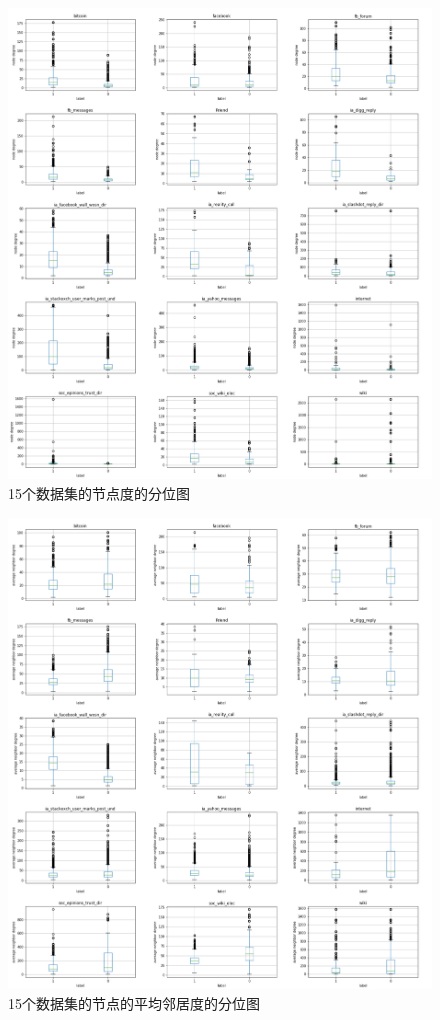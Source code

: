 \begin{figure}[!htbp]
	\setlength{\abovecaptionskip}{0pt} 
	\setlength{\belowcaptionskip}{10pt} 
	\includegraphics[width=.9\textwidth]{./figure/alldata-DG.pdf}
	\caption{15个数据集的节点度的分位图}
	\label{fig.3.4}
\end{figure}

\begin{figure}[!htbp]
	\setlength{\abovecaptionskip}{0pt} 
	\setlength{\belowcaptionskip}{10pt} 
	\includegraphics[width=.9\textwidth]{./figure/alldata-aND.pdf}
	\caption{15个数据集的节点的平均邻居度的分位图}
	\label{fig.3.5}
\end{figure}


